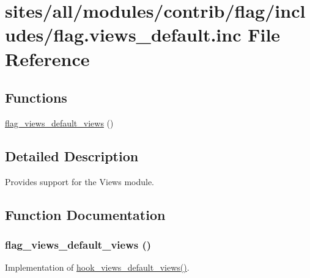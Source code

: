 \hypertarget{flag_8views__default_8inc}{
\section{sites/all/modules/contrib/flag/includes/flag.views\_\-default.inc File Reference}
\label{flag_8views__default_8inc}
}
\subsection*{Functions}
\begin{CompactItemize}
\item 
\hyperlink{flag_8views__default_8inc_69d0a02691d3d7c8bf5d23faed1c2bbc}{flag\_\-views\_\-default\_\-views} ()
\end{CompactItemize}


\subsection{Detailed Description}
Provides support for the Views module. 

\subsection{Function Documentation}
\hypertarget{flag_8views__default_8inc_69d0a02691d3d7c8bf5d23faed1c2bbc}{
\subsubsection[{flag\_\-views\_\-default\_\-views}]{\setlength{\rightskip}{0pt plus 5cm}flag\_\-views\_\-default\_\-views ()}}
\label{flag_8views__default_8inc_69d0a02691d3d7c8bf5d23faed1c2bbc}


Implementation of \hyperlink{group__views__hooks_g23edb74860682fa88f75cf94b97c2e15}{hook\_\-views\_\-default\_\-views()}. 